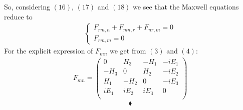 So, considering $(16)$, $(17)$ and $ (18)$ we see that the Maxwell equations reduce to 
\begin{align}\left\{\begin{array}{l}
F_{rm,n}+F_{mn,r}+F_{nr,m}=0\\
F_{rm,m}=0
\end{array}\right.
\end{align}
For the explicit expression of $F_{mn}$ we get from $(3)$ and $(4)$:
\begin{align}
F_{mn}=
\left(
\begin{matrix}
0&H_3&-H_1&-iE_1\\
-H_3&0&H_2&-iE_2\\
H_1&-H_2&0&-iE_3\\
iE_1&iE_2&iE_3&0\\
\end{matrix}
\right)
\end{align}
 $$\blacklozenge$$
\newpage



